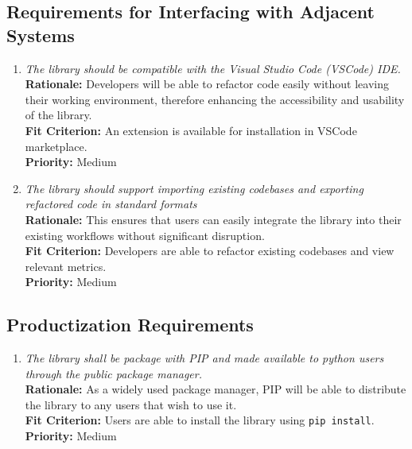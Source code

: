 \documentclass[12pt]{article}
\begin{document}
\subsection{Requirements for Interfacing with Adjacent Systems}
\begin{enumerate}[label=OER-IAS \arabic*., wide=0pt, leftmargin=*]
  \item \emph{The library should be compatible with the Visual Studio
    Code (VSCode) IDE.}\\[2mm]
    {\bf Rationale:} Developers will be able to refactor code easily
    without leaving their working environment, therefore enhancing
    the accessibility and usability of the library.\\
    {\bf Fit Criterion:} An extension is available for installation
    in VSCode marketplace.\\
    {\bf Priority:} Medium
  \item \emph{The library should support importing existing codebases
    and exporting refactored code in standard formats}\\[2mm]
    {\bf Rationale:} This ensures that users can easily integrate the
    library into their existing workflows without significant disruption.\\
    {\bf Fit Criterion:} Developers are able to refactor existing
    codebases and view relevant metrics.\\
    {\bf Priority:} Medium
\end{enumerate}

\subsection{Productization Requirements}
\begin{enumerate}[label=OER-PR \arabic*., wide=0pt, leftmargin=*]
  \item \emph{The library shall be package with PIP and made
    available to python users through the public package manager.}\\[2mm]
    {\bf Rationale:} As a widely used package manager, PIP will be
    able to distribute the library to any users that wish to use it.\\
    {\bf Fit Criterion:} Users are able to install the library using
    \texttt{pip install}. \\
    {\bf Priority:} Medium
\end{enumerate}
\end{document}
